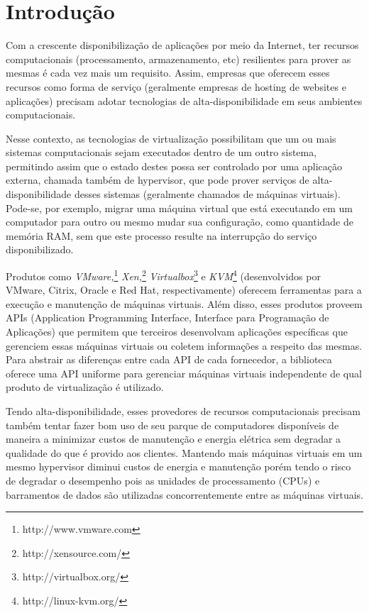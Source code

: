 %
%

\chapter{Introdução}

Com a crescente disponibilização de aplicações por meio da Internet, ter
recursos computacionais (processamento, armazenamento, etc) resilientes
para prover as mesmas é cada vez mais um requisito. Assim, empresas que
oferecem esses recursos como forma de serviço (geralmente empresas de
hosting de websites e aplicações) precisam adotar tecnologias de
alta-disponibilidade em seus ambientes computacionais.

Nesse contexto, as tecnologias de virtualização possibilitam que um ou mais
sistemas computacionais sejam executados dentro de um outro sistema,
permitindo assim que o estado destes possa ser controlado por uma aplicação
externa, chamada também de hypervisor, que pode prover serviços de
alta-disponibilidade desses sistemas (geralmente chamados de máquinas
virtuais). Pode-se, por exemplo, migrar uma máquina virtual que está
executando em um computador para outro ou mesmo mudar sua configuração,
como quantidade de memória RAM, sem que este processo resulte na
interrupção do serviço disponibilizado.

Produtos como \emph{VMware,}\footnote{http://www.vmware.com}
\emph{Xen,}\footnote{http://xensource.com/}
\emph{Virtualbox}\footnote{http://virtualbox.org/} e
\emph{KVM}\footnote{http://linux-kvm.org/} (desenvolvidos por VMware,
Citrix, Oracle e Red Hat, respectivamente) oferecem ferramentas para a
execução e manutenção de máquinas virtuais. Além disso, esses produtos
proveem APIs (Application Programming Interface, Interface para Programação
de Aplicações) que permitem que terceiros desenvolvam aplicações
específicas que gerenciem essas máquinas virtuais ou coletem informações a
respeito das mesmas. Para abstrair as diferenças entre cada API de cada
fornecedor, a biblioteca \libvirt{} oferece uma API uniforme para gerenciar
máquinas virtuais independente de qual produto de virtualização é
utilizado.

Tendo alta-disponibilidade, esses provedores de recursos computacionais
precisam também tentar fazer bom uso de seu parque de computadores
disponíveis de maneira a  minimizar custos de manutenção e energia elétrica
sem degradar a qualidade do que é provido aos clientes. Mantendo mais
máquinas virtuais em um mesmo hypervisor diminui custos de energia e
manutenção porém tendo o risco de degradar o desempenho pois as unidades de
processamento (CPUs) e barramentos de dados são utilizadas concorrentemente
entre as máquinas virtuais.

